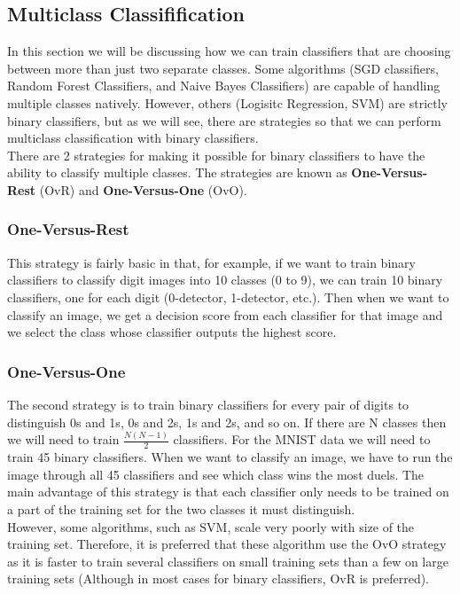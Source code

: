 \subsection{Multiclass Classifification}

In this section we will be discussing how we can train classifiers that are choosing between more than just 
two separate classes. Some algorithms (SGD classifiers, Random Forest Classifiers, and Naive Bayes Classifiers) are 
capable of handling multiple classes natively. However, others (Logisitc Regression, SVM) are strictly binary
classifiers, but as we will see, there are strategies so that we can perform multiclass classification with 
binary classifiers. \\

\noindent
There are 2 strategies for making it possible for binary classifiers to have the ability to classify multiple 
classes. The strategies are known as \textbf{One-Versus-Rest} (OvR) and \textbf{One-Versus-One} (OvO).

\subsubsection*{One-Versus-Rest}

This strategy is fairly basic in that, for example, if we want to train binary classifiers to classify digit images
into 10 classes (0 to 9), we can train 10 binary classifiers, one for each digit (0-detector, 1-detector, etc.). Then
when we want to classify an image, we get a decision score from each classifier for that image and we select the 
class whose classifier outputs the highest score.

\subsubsection*{One-Versus-One}

The second strategy is to train binary classifiers for every pair of digits to distinguish 0s and 1s, 0s and 2s, 
1s and 2s, and so on. If there are N classes then we will need to train $\frac{N(N-1)}{2}$ classifiers. For the 
MNIST data we will need to train 45 binary classifiers. When we want to classify an image, we have to run the image
through all 45 classifiers and see which class wins the most duels. The main advantage of this strategy is that each
classifier only needs to be trained on a part of the training set for the two classes it must distinguish. \\

\noindent
However, some algorithms, such as SVM, scale very poorly with size of the training set. Therefore, it is preferred that
these algorithm use the OvO strategy as it is faster to train several classifiers on small training sets than a few
on large training sets (Although in most cases for binary classifiers, OvR is preferred).
